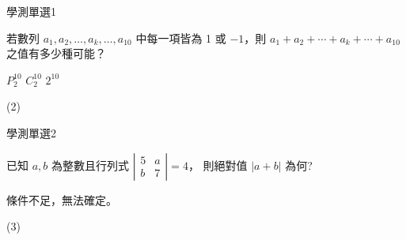     \begin{QUESTION}
        \begin{ExamInfo}{99}{學測}{單選}{1}
        \end{ExamInfo}
        \begin{ExamAnsRateInfo}{49}{82}{49}{16}
        \end{ExamAnsRateInfo}
        \begin{QBODY}
            若數列 $a_1,a_2,\dots,a_k,\dots,a_{10}$ 中每一項皆為 1 或 $-1$，則 $a_1 +a_2 +\cdots +a_k +\cdots+a_{10}$ 之值有多少種可能？
			\begin{QOPS} 
				\QOP $P^{10}_2$    
				\QOP $C^{10}_2$    
				\QOP $2^{10}$
			\end{QOPS}
        \end{QBODY}
        \begin{QFROMS}
        \end{QFROMS}
        \begin{QTAGS}\end{QTAGS}
        \begin{QANS}
            (2)
        \end{QANS}
        \begin{QSOLLIST}
        \end{QSOLLIST}
        \begin{QEMPTYSPACE}
        \end{QEMPTYSPACE}
    \end{QUESTION}
    \begin{QUESTION}
        \begin{ExamInfo}{99}{學測}{單選}{2}
        \end{ExamInfo}
        \begin{ExamAnsRateInfo}{58}{83}{62}{29}
        \end{ExamAnsRateInfo}
        \begin{QBODY}
            已知 $a,b$ 為整數且行列式 $\left| \begin{array}{cc} 5 & a \\ b & 7  \end{array}\right| =4$，
			則絕對值 $|a+b|$ 為何? 
			\begin{QOPS} 
				\QOP 16 
				\QOP 31 
				\QOP 32 
				\QOP 39 
				\QOP 條件不足，無法確定。
			\end{QOPS}
        \end{QBODY}
        \begin{QFROMS}
        \end{QFROMS}
        \begin{QTAGS}\end{QTAGS}
        \begin{QANS}
            (3)
        \end{QANS}
        \begin{QSOLLIST}
        \end{QSOLLIST}
        \begin{QEMPTYSPACE}
        \end{QEMPTYSPACE}
    \end{QUESTION}
